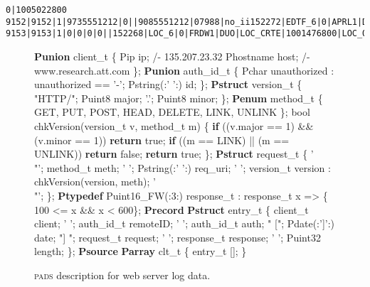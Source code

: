 \documentclass{sigplanconf}
\newcommand{\dibbler}{Sirius}
\newcommand{\bftt}[1]{{\ttfamily\bfseries{#1}}}
\newcommand{\kw}[1]{\bftt{#1}}
\newcommand{\pads}{\textsc{pads}}
\begin{document}
\begin{figure*}
\begin{small}
\begin{center}
\begin{verbatim}
0|1005022800
9152|9152|1|9735551212|0||9085551212|07988|no_ii152272|EDTF_6|0|APRL1|DUO|10|1000295291
9153|9153|1|0|0|0|0||152268|LOC_6|0|FRDW1|DUO|LOC_CRTE|1001476800|LOC_OS_10|1001649601
\end{verbatim}
\caption{Tiny example of \dibbler{} provisioning data.}
\label{figure:dibbler-records}
\end{center}
\end{small}
\end{figure*}


\begin{figure}
\begin{code}
\kw{Punion} client\_t \{
  Pip       ip;      /- 135.207.23.32
  Phostname host;    /- www.research.att.com
\};
\mbox{}
\kw{Punion} auth\_id\_t \{
  Pchar unauthorized : unauthorized == '-';
  Pstring(:' ':) id;
\};
\mbox{}
\kw{Pstruct} version\_t \{
  "HTTP/";
  Puint8 major; '.';
  Puint8 minor;
\};
\mbox{}
\kw{Penum} method\_t \{
    GET,    PUT,  POST,  HEAD,
    DELETE, LINK, UNLINK
\};
\mbox{}
bool chkVersion(version\_t v, method\_t m) \{
  \kw{if} ((v.major == 1) && (v.minor == 1)) \kw{return} true;
  \kw{if} ((m == LINK) || (m == UNLINK)) \kw{return} false;
  \kw{return} true;
\};
\mbox{}
\kw{Pstruct} request\_t \{
  '\\"';   method\_t       meth;
  ' ';    Pstring(:' ':) req\_uri;
  ' ';    version\_t      version :
                  chkVersion(version, meth);
  '\\"';
\};
\mbox{}
\kw{Ptypedef} Puint16\_FW(:3:) response\_t :
         response\_t x => \{ 100 <= x && x < 600\};
\mbox{}
\kw{Precord} \kw{Pstruct} entry\_t \{
         client\_t       client;
   ' ';  auth\_id\_t      remoteID;
   ' ';  auth\_id\_t      auth;
   " ["; Pdate(:']':)   date;
   "] "; request\_t      request;
   ' ';  response\_t     response;
   ' ';  Puint32        length;
\};
\mbox{}
\kw{Psource} \kw{Parray} clt\_t \{
  entry\_t [];
\}
\end{code}
\caption{\pads{} description for web server log data.}
\label{figure:wsl}
\end{figure}
\end{document}
